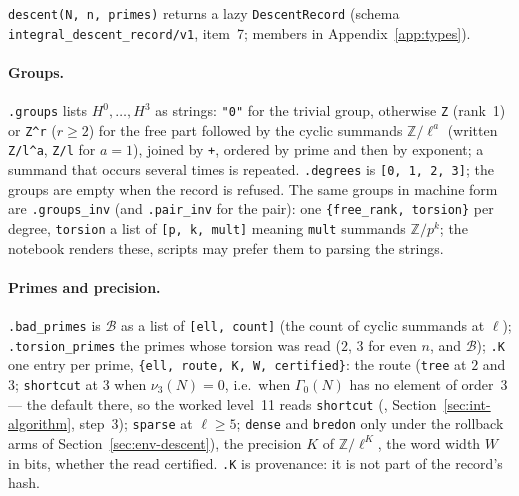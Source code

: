 \documentclass[11pt,openany]{report}
\newcommand{\Z}{\mathbb{Z}}
\newcommand{\vb}[1]{\texttt{#1}}
\begin{document}
\vb{descent(N, n, primes)} returns a lazy \vb{DescentRecord} (schema \texttt{integral\_descent\_record/v1},
{} item~7; members in Appendix~\ref{app:types}).

\paragraph{Groups.} \texttt{.groups} lists $H^0,\dots,H^3$ as strings: \texttt{"0"} for the trivial group, otherwise
\texttt{Z} (rank~1) or \texttt{Z\^{}r} ($r\ge2$) for the free part followed by the cyclic summands $\Z/\ell^a$ (written \texttt{Z/l\^{}a}, \texttt{Z/l} for
$a=1$), joined by \texttt{+}, ordered by prime and then by exponent; a summand that occurs several times is repeated.
\texttt{.degrees} is \texttt{[0, 1, 2, 3]}; the groups are empty when the record is refused. The same groups in machine form are \texttt{.groups\_inv}
(and \texttt{.pair\_inv} for the pair): one \texttt{\{free\_rank, torsion\}} per degree, \texttt{torsion} a list of
\texttt{[p, k, mult]} meaning \texttt{mult} summands $\Z/p^k$; the notebook renders these, scripts may prefer them to parsing
the strings.

\paragraph{Primes and precision.} \texttt{.bad\_primes} is $\mathcal B$ as a list of \texttt{[ell, count]} (the count of
cyclic summands at $\ell$); \texttt{.torsion\_primes} the primes whose torsion was read ($2$, $3$ for even $n$, and
$\mathcal B$); \texttt{.K} one entry per prime, \texttt{\{ell, route, K, W, certified\}}: the route (\texttt{tree} at $2$
and $3$; \texttt{shortcut} at $3$ when $\nu_3(N)=0$, i.e.\ when $\Gamma_0(N)$ has no element of order~3 --- the default
there, so the worked level~11 reads \texttt{shortcut} ({}, Section~\ref{sec:int-algorithm},
step~3); \texttt{sparse} at $\ell\ge5$; \texttt{dense} and \texttt{bredon} only under the rollback arms of
Section~\ref{sec:env-descent}), the precision $K$ of $\Z/\ell^K$, the word width $W$ in bits, whether the read certified.
\texttt{.K} is provenance: it is not part of the record's hash.
\end{document}
